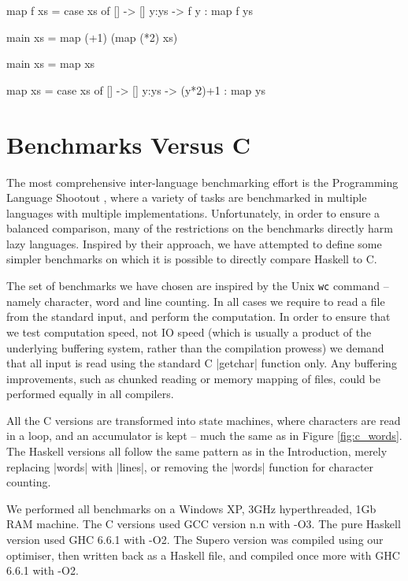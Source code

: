 \documentclass{llncs}
\begin{document}
\begin{code}
map f xs = case  xs of
                 []    -> []
                 y:ys  -> f y : map f ys

main xs = map (+1) (map (*2) xs)
\end{code}

\begin{code}
main xs = map xs

map xs = case  xs of
               []    -> []
               y:ys  -> (y*2)+1 : map ys
\end{code}






\section{Benchmarks Versus C}

The most comprehensive inter-language benchmarking effort is the Programming Language Shootout \cite{shootout}, where a variety of tasks are benchmarked in multiple languages with multiple implementations. Unfortunately, in order to ensure a balanced comparison, many of the restrictions on the benchmarks directly harm lazy languages. Inspired by their approach, we have attempted to define some simpler benchmarks on which it is possible to directly compare Haskell to C.

The set of benchmarks we have chosen are inspired by the Unix \texttt{wc} command -- namely character, word and line counting. In all cases we require to read a file from the standard input, and perform the computation. In order to ensure that we test computation speed, not IO speed (which is usually a product of the underlying buffering system, rather than the compilation prowess) we demand that all input is read using the standard C |getchar| function only. Any buffering improvements, such as chunked reading or memory mapping of files, could be performed equally in all compilers.

All the C versions are transformed into state machines, where characters are read in a loop, and an accumulator is kept -- much the same as in Figure \ref{fig:c_words}. The Haskell versions all follow the same pattern as in the Introduction, merely replacing |words| with |lines|, or removing the |words| function for character counting.

We performed all benchmarks on a Windows XP, 3GHz hyperthreaded, 1Gb RAM machine. The C versions used GCC version n.n with -O3. The pure Haskell version used GHC 6.6.1 with -O2. The Supero version was compiled using our optimiser, then written back as a Haskell file, and compiled once more with GHC 6.6.1 with -O2.
\end{document}
